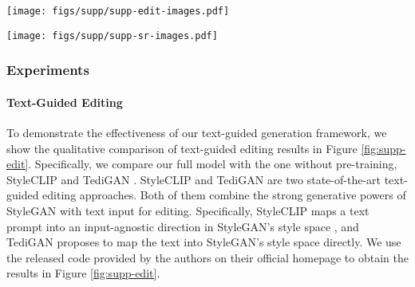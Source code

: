 \begin{figure*}
    \centering
    \texttt{[image: figs/supp/supp-edit-images.pdf]}
    \caption{\textbf{Qualitative comparison of text-guided editing results}. We show from left to right the inputs, results of our full model, results of our model without pre-training, results of StyleCLIP \cite{patashnik2021styleclip} and TediGAN \cite{xia2021tedigan}. The comparison shows that our pre-trained model can benefit the downstream text-guided editing task and achieve state-of-the-art performance. Due to the vision-aware text embedding learned from pre-training, our full model is able to attend to ``She", ``eyeglasses" and ``rep lipstick" in the first case and accurately edit the images accordingly.}
    \label{fig:supp-edit}
\end{figure*}

\begin{figure*}
    \centering
    \texttt{[image: figs/supp/supp-sr-images.pdf]}
    \caption{\textbf{Qualitative comparison of more super-resolution results}.  We show from left to right the inputs, results of our full model, results of our model without pre-training, results of  SR3~\cite{saharia2021sr3} and pSp~\cite{richardson2021psp}. Our pre-trained model could generate realistic results with more textual attributes (\textit{e.g.}, eyeglasses in the first example, big lips and arched eyebrows in the 5-th example) due to the power of our pre-trained model.}
    \label{fig:supp-sr}
\end{figure*}

\subsubsection{Experiments}
\label{sec:exp}

\paragraph{Text-Guided Editing}
To demonstrate the effectiveness of our text-guided generation framework, we show the qualitative comparison of text-guided editing results in Figure \ref{fig:supp-edit}. Specifically, we compare our full model with the one without pre-training, StyleCLIP \cite{patashnik2021styleclip} and TediGAN \cite{xia2021tedigan}. StyleCLIP and TediGAN are two state-of-the-art text-guided editing approaches. Both of them combine the strong generative powers of StyleGAN with text input for editing. Specifically, StyleCLIP maps a text prompt into an input-agnostic direction in StyleGAN's style space \cite{patashnik2021styleclip}, and TediGAN proposes to map the text into StyleGAN's style space directly. We use the released code provided by the authors on their official homepage to obtain the results in Figure \ref{fig:supp-edit}. 

